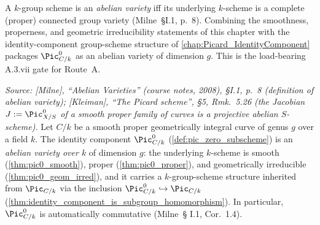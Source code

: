 A \(k\)-group scheme is an \emph{abelian variety} iff its underlying
\(k\)-scheme is a complete (proper) connected group variety
(Milne~\S I.1, p.~8). Combining the smoothness, properness, and
geometric irreducibility statements of this chapter with the
identity-component group-scheme structure of
\cref{chap:Picard_IdentityComponent} packages \(\Pic^0_{C/k}\) as an
abelian variety of dimension \(g\). This is the load-bearing A.3.vii
gate for Route~A.

\begin{theorem}
  \label{thm:pic0_isAbelianVariety}

  \textit{Source: [Milne], ``Abelian Varieties'' (course notes, 2008),
  \S I.1, p.~8 (definition of abelian variety); [Kleiman], ``The
  Picard scheme'', \S 5, Rmk.~5.26 (the Jacobian
  \(J := \Pic^0_{X/S}\) of a smooth proper family of curves is a
  projective abelian \(S\)-scheme).}
  Let \(C/k\) be a smooth proper geometrically integral curve of
  genus \(g\) over a field \(k\). The identity component
  \(\Pic^0_{C/k}\) (\cref{def:pic_zero_subscheme}) is an
  \emph{abelian variety over \(k\)} of dimension \(g\): the underlying
  \(k\)-scheme is smooth (\cref{thm:pic0_smooth}), proper
  (\cref{thm:pic0_proper}), and geometrically irreducible
  (\cref{thm:pic0_geom_irred}), and it carries a \(k\)-group-scheme
  structure inherited from \(\Pic_{C/k}\) via the inclusion
  \(\Pic^0_{C/k} \hookrightarrow \Pic_{C/k}\)
  (\cref{thm:identity_component_is_subgroup_homomorphism}). In
  particular, \(\Pic^0_{C/k}\) is automatically commutative (Milne~\S
  I.1, Cor.~1.4).
\end{theorem}

